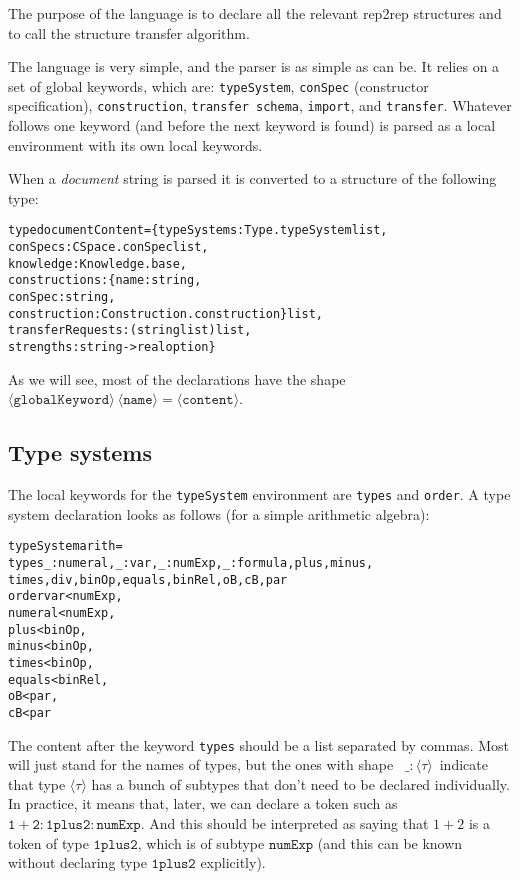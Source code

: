 \documentclass[a4paper]{article}
\theoremstyle{definition}
\begin{document}
	The purpose of the language is to declare all the relevant rep2rep structures and to call the structure transfer algorithm.

	The language is very simple, and the parser is as simple as can be. It relies on a set of global keywords, which are: \texttt{typeSystem}, \texttt{conSpec} (constructor specification), \texttt{construction}, \texttt{transfer schema}, \texttt{import}, and \texttt{transfer}. Whatever follows one keyword (and before the next keyword is found) is parsed as a local environment with its own local keywords.

	When a \textit{document} string is parsed it is converted to a structure of the following type:
\begin{alltt}
type documentContent = \{typeSystems : Type.typeSystem list,
                        conSpecs : CSpace.conSpec list,
                        knowledge : Knowledge.base,
                        constructions : \{name : string,
                                         conSpec : string,
                                         construction : Construction.construction\} list,
                        transferRequests : (string list) list,
                        strengths : string -> real option\}
\end{alltt}

	As we will see, most of the declarations have the shape  $\mathtt{\langle globalKeyword\rangle\ \langle name\rangle = \langle content\rangle}$.

	\subsection{Type systems}
	The local keywords for the \texttt{typeSystem} environment are \texttt{types} and \texttt{order}. A type system declaration looks as follows (for a simple arithmetic algebra):
\begin{alltt}
typeSystem arith =
    types _:numeral, _:var, _:numExp, _:formula, plus, minus,
          times, div, binOp, equals, binRel, oB, cB, par
    order var < numExp,
          numeral < numExp,
          plus < binOp,
          minus < binOp,
          times < binOp,
          equals < binRel,
          oB < par,
          cB < par
\end{alltt}
	The content after the keyword \texttt{types} should be a list separated by commas. Most will just stand for the names of types, but the ones with shape \ $\mathtt{\_:\langle \tau\rangle}$\ indicate that type $\mathtt{\langle \tau\rangle}$ has a bunch of subtypes that don't need to be declared individually. In practice, it means that, later, we can declare a token such as $\mathtt{1+2:1plus2:numExp}$. And this should be interpreted as saying that $1+2$ is a token of type $\mathtt{1plus2}$, which is of subtype $\mathtt{numExp}$ (and this can be known without declaring type $\mathtt{1plus2}$ explicitly).
\end{document}
